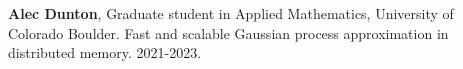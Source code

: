 \begin{innerlist}

  \item[] \textbf{Alec Dunton},
  Graduate student in Applied Mathematics,
  University of Colorado Boulder.
  Fast and scalable Gaussian process approximation in distributed memory.
  2021-2023.

\end{innerlist}